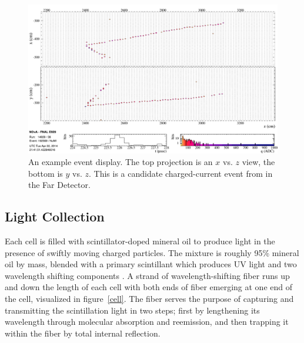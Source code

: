 \begin{figure}[t]
\begin{center}
\includegraphics[width=\textwidth]{figures/evd/evd_numu_cand.png}
\end{center}
\caption{An example \nova event display.  The top projection is an $x$ vs. $z$ view, the bottom is $y$ vs. $z$.  This is a candidate \numu charged-current event from in the Far Detector.}
\label{eventDisplay}
\end{figure}

\subsection{Light Collection}

Each cell is filled with scintillator-doped mineral oil to produce light in the presence of swiftly moving charged particles.  The mixture is roughly 95\% mineral oil by mass, blended with a primary scintillant which produces UV light and two wavelength shifting components \cite{mufson2015liquid}.  A strand of wavelength-shifting fiber runs up and down the length of each cell with both ends of fiber emerging at one end of the cell, visualized in figure~\ref{cell}.  The fiber serves the purpose of capturing and transmitting the scintillation light in two steps; first by lengthening its wavelength through molecular absorption and reemission, and then trapping it within the fiber by total internal reflection.


